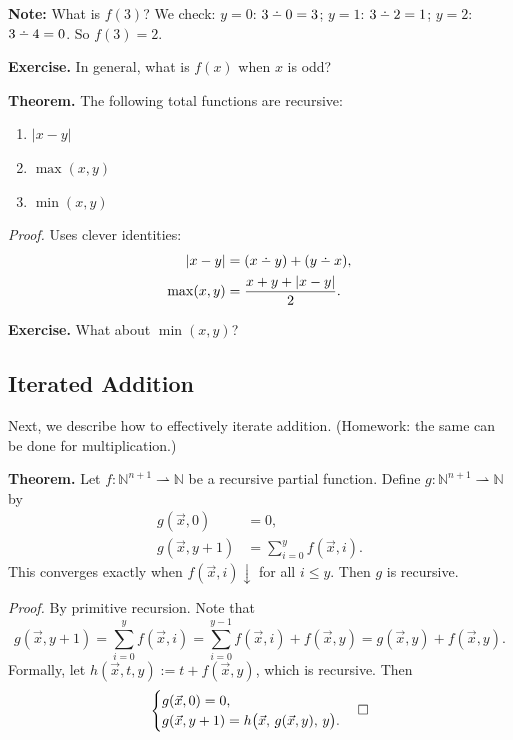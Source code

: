 \documentclass[11pt]{article}
\newcommand{\dotminus}{\mathbin{\ooalign{\hidewidth\raise0.5ex\hbox{$\cdot$}\hidewidth\cr$-$\cr}}}
\begin{document}
\textbf{Note:} What is $f(3)$? We check: $y = 0$: $3 \dotminus 0 = 3$; $y = 1$: $3 \dotminus 2 = 1$; $y = 2$: $3 \dotminus 4 = 0$. So $f(3) = 2$.

\textbf{Exercise.} In general, what is $f(x)$ when $x$ is odd?

\textbf{Theorem.} The following total functions are recursive:
\begin{enumerate}[leftmargin=1.8em, label=\arabic*)]
    \item $|x - y|$
    \item $\max(x, y)$
    \item $\min(x, y)$
\end{enumerate}

\textit{Proof.} Uses clever identities:
\begin{align*}
    |x - y| &= (x \dotminus y) + (y \dotminus x), \\
    \max(x, y) &= \frac{x + y + |x - y|}{2}.
\end{align*}

\textbf{Exercise.} What about $\min(x, y)$?

\subsection{Iterated Addition}

Next, we describe how to effectively iterate addition. (Homework: the same can be done for multiplication.)

\textbf{Theorem.} Let $f\colon \mathbb{N}^{n+1} \rightharpoonup \mathbb{N}$ be a recursive partial function. Define $g\colon \mathbb{N}^{n+1} \rightharpoonup \mathbb{N}$ by
\begin{align*}
    g(\vec{x}, 0) &= 0, \\
    g(\vec{x}, y+1) &= \sum_{i=0}^{y} f(\vec{x}, i).
\end{align*}
This converges exactly when $f(\vec{x}, i){\downarrow}$ for all $i \le y$. Then $g$ is recursive.

\textit{Proof.} By primitive recursion. Note that
\[
    g(\vec{x}, y+1) = \sum_{i=0}^{y} f(\vec{x}, i) = \sum_{i=0}^{y-1} f(\vec{x}, i) + f(\vec{x}, y) = g(\vec{x}, y) + f(\vec{x}, y).
\]
Formally, let $h(\vec{x}, t, y) := t + f(\vec{x}, y)$, which is recursive. Then
\[
    \begin{cases} g(\vec{x}, 0) = 0, \\ g(\vec{x}, y+1) = h\bigl(\vec{x},\, g(\vec{x}, y),\, y\bigr). \end{cases} \hfill\square
\]
\end{document}
